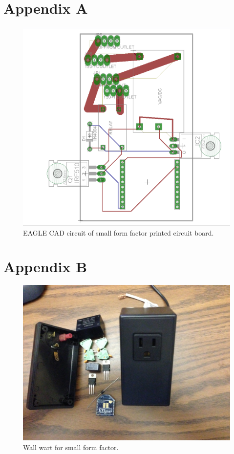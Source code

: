 \documentclass{sigchi}
\begin{document}
\section{Appendix A}

\begin{figure}[!h]
\centering
\includegraphics[width=0.9\columnwidth]{app_a}
\caption{EAGLE CAD circuit of small form factor printed circuit board.}
\label{fig:app_a}
\end{figure}

\section{Appendix B}

\begin{figure}[!h]
\centering
\includegraphics[width=0.9\columnwidth]{app_b}
\caption{Wall wart for small form factor.}
\label{fig:app_b}
\end{figure}
\newpage
\end{document}
